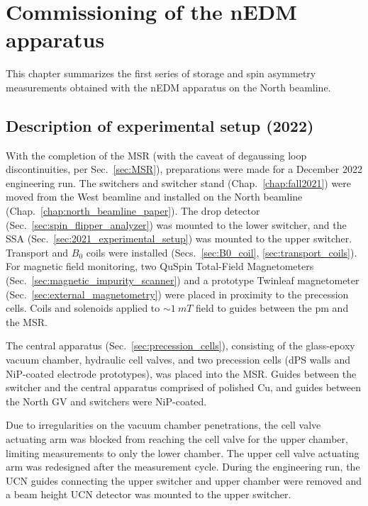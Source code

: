 
\chapter{Commissioning of the nEDM apparatus}\label{chap:nEDM_commissioning_dec2022}


This chapter summarizes the first series of storage and spin asymmetry measurements obtained with the nEDM apparatus on the North beamline. 


\section{Description of experimental setup (2022)}


With the completion of the MSR (with the caveat of degaussing loop discontinuities, per Sec.~\ref{sec:MSR}), preparations were made for a December 2022 engineering run. The switchers and switcher stand (Chap.~\ref{chap:fall2021}) were moved from the West beamline and installed on the North beamline (Chap.~\ref{chap:north_beamline_paper}). The drop detector (Sec.~\ref{sec:spin_flipper_analyzer}) was mounted to the lower switcher, and the SSA (Sec.~\ref{sec:2021_experimental_setup}) was mounted to the upper switcher. Transport and $B_0$ coils were installed (Secs.~\ref{sec:B0_coil}, \ref{sec:transport_coils}). For magnetic field monitoring, two QuSpin Total-Field Magnetometers (Sec.~\ref{sec:magnetic_impurity_scanner}) and a prototype Twinleaf magnetometer (Sec.~\ref{sec:external_magnetometry}) were placed in proximity to the precession cells. Coils and solenoids applied to $\sim \qty{1}{mT}$ field to guides between the \acrshort{pm} and the MSR.

The central apparatus (Sec.~\ref{sec:precession_cells}), consisting of the glass-epoxy vacuum chamber, hydraulic cell valves, and two precession cells (dPS walls and NiP-coated electrode prototypes), was placed into the MSR. Guides between the switcher and the central apparatus comprised of polished Cu, and guides between the North GV and switchers were NiP-coated.

Due to irregularities on the vacuum chamber penetrations, the cell valve actuating arm was blocked from reaching the cell valve for the upper chamber, limiting measurements to only the lower chamber. The upper cell valve actuating arm was redesigned after the measurement cycle. During the engineering run, the UCN guides connecting the upper switcher and upper chamber were removed and a beam height UCN detector was mounted to the upper switcher.


